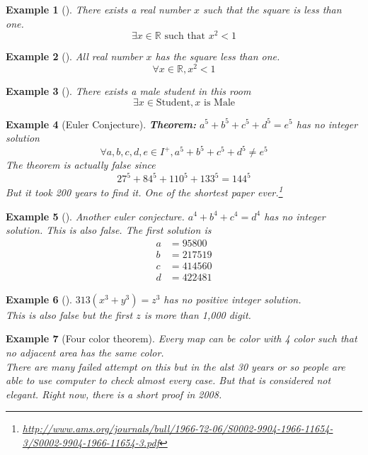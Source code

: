 \documentclass[a4paper, 12pt]{article}
\newcommand{\real}{\mathbb{R}}
\newcommand{\theorem}{\textbf{Theorem:} }
\theoremstyle{examplestyle}
\newtheorem{examplethm}{Example}
\newenvironment{example}[1][]{\begin{mdframed}[style=example]\begin{examplethm}[#1]}{\end{examplethm}\end{mdframed}}
\begin{document}
\begin{multicols}{2}
\begin{example}
	There exists a real number $x$ such that the square is less than one.
	\[
	\exists x \in \real \text{ such that } x^2 < 1
	\]
\end{example}


\begin{example}
	All real number $x$ has the square less than one.
	\[
	\forall x \in \real, x^2 < 1
	\]
\end{example}

\begin{example}
	There exists a male student in this room
	\[
	\exists x \in \text{Student}, x \text{ is Male}
	\]
\end{example}
\newpage
\begin{example}[Euler Conjecture]
	\theorem $a^5 + b^5 + c^5 + d^5 = e^5$ has no integer solution
	\[
		\forall a,b,c,d,e \in I^+, 	a^5 + b^5 + c^5 + d^5 \ne e^5
	\]
	The theorem is actually false since
	\[
		27^5 + 84^5 + 110^5 +133^5 = 144^5
	\]
	But it took 200 years to find it. One of the shortest paper ever.\footnote{\url{http://www.ams.org/journals/bull/1966-72-06/S0002-9904-1966-11654-3/S0002-9904-1966-11654-3.pdf}}
\end{example}

\begin{example}
	Another euler conjecture. $a^4 + b^4 + c^4 = d^4$ has no integer solution.
	This is also false. The first solution is
	\begin{align*}
		a & = 95800\\
		b & = 217519\\
		c & = 414560\\
		d & = 422481
	\end{align*}
\end{example}

\begin{example}
	$313(x^3+y^3) = z^3$ has no positive integer solution.\\
	This is also false but the first $z$ is more than 1,000 digit.
\end{example}

\begin{example}[Four color theorem]
	Every map can be color with 4 color such that no adjacent area has the same color.\\
	
	There are many failed attempt on this but in the alst 30 years or so people are able to use computer to check almost every case. But that is considered not elegant. Right now, there is a short proof in 2008.
\end{example}


\end{multicols}
\end{document}
